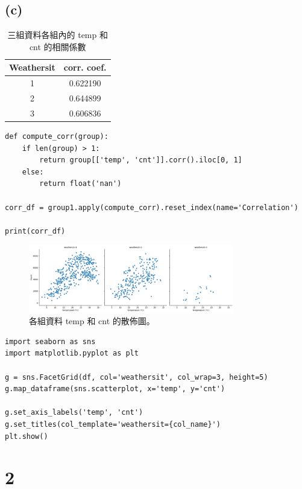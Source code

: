 \documentclass{article}
\begin{document}
\subsection*{(c)}
\begin{table}[h!]
\centering
\begin{tabular}{|c|c|}
\hline
Weathersit & corr. coef.  \\ \hline
1 & 0.622190  \\ \hline
2 & 0.644899  \\ \hline
3 & 0.606836  \\ \hline
\end{tabular}
\caption{三組資料各組內的 temp 和 cnt 的相關係數}
\label{tab:example}
\end{table}
\begin{lstlisting}[caption={(c)小題的 Python Code}]
def compute_corr(group):
    if len(group) > 1:  
        return group[['temp', 'cnt']].corr().iloc[0, 1]
    else:
        return float('nan') 

corr_df = group1.apply(compute_corr).reset_index(name='Correlation')

print(corr_df)
\end{lstlisting}
\begin{figure}[h!]
    \centering
    \includegraphics[width=0.8\textwidth]{plot.png}
    \caption{各組資料 temp 和 cnt 的散佈圖。}
\end{figure}
\begin{lstlisting}[caption={產生散佈圖的 Python Code}]
import seaborn as sns
import matplotlib.pyplot as plt

g = sns.FacetGrid(df, col='weathersit', col_wrap=3, height=5)
g.map_dataframe(sns.scatterplot, x='temp', y='cnt')

g.set_axis_labels('temp', 'cnt')
g.set_titles(col_template='weathersit={col_name}')
plt.show()
\end{lstlisting}

\section*{2}
\end{document}
